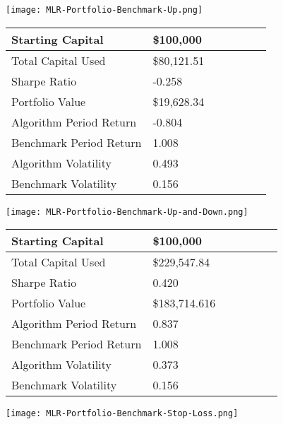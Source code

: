 \begin{center}  
    \texttt{[image: MLR-Portfolio-Benchmark-Up.png]}
    \label{fig:nonfloat}
\end{center}

\begin{center}
    \begin{tabular}{ | l | l | l | | l | l | l | p{5cm} |}
    \hline
    Starting Capital & \$100,000 \\ \hline
    Total Capital Used & \$80,121.51 \\ \hline
    Sharpe Ratio & -0.258 \\ \hline
    Portfolio Value & \$19,628.34 \\ \hline
    Algorithm Period Return & -0.804 \\ \hline
    Benchmark Period Return & 1.008 \\ \hline
    Algorithm Volatility & 0.493 \\ \hline
    Benchmark Volatility & 0.156 \\
    \hline
    \end{tabular}
    \label{table:nonfloat}
\end{center}

\begin{center}  
    \texttt{[image: MLR-Portfolio-Benchmark-Up-and-Down.png]}
    \label{fig:nonfloat}
\end{center}

\begin{center}
    \begin{tabular}{ | l | l | l | | l | l | l | p{5cm} |}
    \hline
    Starting Capital & \$100,000 \\ \hline
    Total Capital Used & \$229,547.84 \\ \hline
    Sharpe Ratio & 0.420 \\ \hline
    Portfolio Value & \$183,714.616 \\ \hline
    Algorithm Period Return & 0.837 \\ \hline
    Benchmark Period Return & 1.008 \\ \hline
    Algorithm Volatility & 0.373 \\ \hline
    Benchmark Volatility & 0.156 \\
    \hline
    \end{tabular}
    \label{table:nonfloat}
\end{center}

\begin{center}  
    \texttt{[image: MLR-Portfolio-Benchmark-Stop-Loss.png]}
    \label{fig:nonfloat}
\end{center}